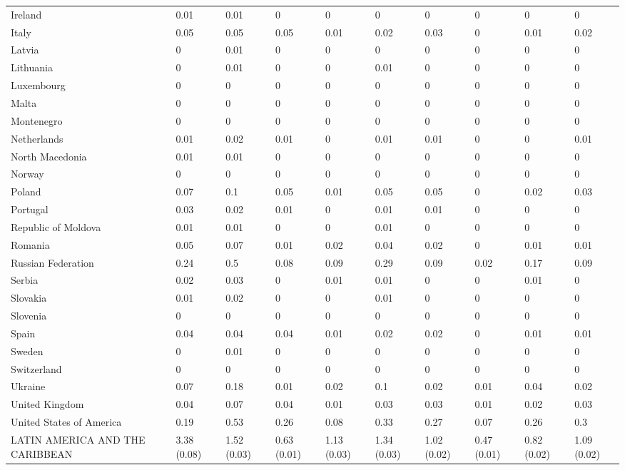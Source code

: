 \begin{longtable}[t]{llllllllll}
Ireland & 0.01 & 0.01 & 0 & 0 & 0 & 0 & 0 & 0 & 0\\
Italy & 0.05 & 0.05 & 0.05 & 0.01 & 0.02 & 0.03 & 0 & 0.01 & 0.02\\
Latvia & 0 & 0.01 & 0 & 0 & 0 & 0 & 0 & 0 & 0\\
Lithuania & 0 & 0.01 & 0 & 0 & 0.01 & 0 & 0 & 0 & 0\\
Luxembourg & 0 & 0 & 0 & 0 & 0 & 0 & 0 & 0 & 0\\
Malta & 0 & 0 & 0 & 0 & 0 & 0 & 0 & 0 & 0\\
Montenegro & 0 & 0 & 0 & 0 & 0 & 0 & 0 & 0 & 0\\
Netherlands & 0.01 & 0.02 & 0.01 & 0 & 0.01 & 0.01 & 0 & 0 & 0.01\\
North Macedonia & 0.01 & 0.01 & 0 & 0 & 0 & 0 & 0 & 0 & 0\\
Norway & 0 & 0 & 0 & 0 & 0 & 0 & 0 & 0 & 0\\
Poland & 0.07 & 0.1 & 0.05 & 0.01 & 0.05 & 0.05 & 0 & 0.02 & 0.03\\
Portugal & 0.03 & 0.02 & 0.01 & 0 & 0.01 & 0.01 & 0 & 0 & 0\\
Republic of Moldova & 0.01 & 0.01 & 0 & 0 & 0.01 & 0 & 0 & 0 & 0\\
Romania & 0.05 & 0.07 & 0.01 & 0.02 & 0.04 & 0.02 & 0 & 0.01 & 0.01\\
Russian Federation & 0.24 & 0.5 & 0.08 & 0.09 & 0.29 & 0.09 & 0.02 & 0.17 & 0.09\\
Serbia & 0.02 & 0.03 & 0 & 0.01 & 0.01 & 0 & 0 & 0.01 & 0\\
Slovakia & 0.01 & 0.02 & 0 & 0 & 0.01 & 0 & 0 & 0 & 0\\
Slovenia & 0 & 0 & 0 & 0 & 0 & 0 & 0 & 0 & 0\\
Spain & 0.04 & 0.04 & 0.04 & 0.01 & 0.02 & 0.02 & 0 & 0.01 & 0.01\\
Sweden & 0 & 0.01 & 0 & 0 & 0 & 0 & 0 & 0 & 0\\
Switzerland & 0 & 0 & 0 & 0 & 0 & 0 & 0 & 0 & 0\\
Ukraine & 0.07 & 0.18 & 0.01 & 0.02 & 0.1 & 0.02 & 0.01 & 0.04 & 0.02\\
United Kingdom & 0.04 & 0.07 & 0.04 & 0.01 & 0.03 & 0.03 & 0.01 & 0.02 & 0.03\\
United States of America & 0.19 & 0.53 & 0.26 & 0.08 & 0.33 & 0.27 & 0.07 & 0.26 & 0.3\\
LATIN AMERICA AND THE CARIBBEAN & 3.38 (0.08) & 1.52 (0.03) & 0.63 (0.01) & 1.13 (0.03) & 1.34 (0.03) & 1.02 (0.02) & 0.47 (0.01) & 0.82 (0.02) & 1.09 (0.02)\\

\end{longtable}
